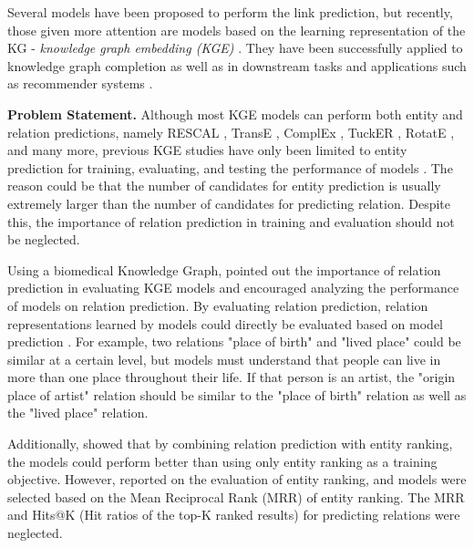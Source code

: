 Several models have been proposed to perform the link prediction, but recently, those given more attention are models based on the learning representation of the KG - \textit{knowledge graph embedding (KGE)} \citep{wang2017knowledge}. They have been successfully applied to knowledge graph completion \citep{2016} as well as in downstream tasks and applications such as recommender systems \citep{wang2017knowledge}.
\newline

\noindent\textbf{Problem Statement.} Although most KGE models can perform both entity and relation predictions, \citep{wang2017knowledge} namely RESCAL \citep{nickel2011three}, TransE \citep{bordes2013translating}, ComplEx \citep{trouillon2016complex}, TuckER \citep{balazevic-etal-2019-tucker}, RotatE \citep{sun2019rotate}, and many more, previous KGE studies have only been limited to entity prediction for training, evaluating, and testing the performance of models \citep{yang2014embedding, wang2014knowledge, trouillon2016complex, shang2018endtoend, sun2019rotate}. 
The reason could be that the number of candidates for entity prediction is usually extremely larger than the number of candidates for predicting relation. Despite this, the importance of relation prediction in training and evaluation should not be neglected.

Using a biomedical Knowledge Graph, \citet{chang2020benchmark} pointed out the importance of relation prediction in evaluating KGE models and encouraged analyzing the performance of models on relation prediction. By evaluating relation prediction, relation representations learned by models could directly be evaluated based on model prediction \citep{chang2020benchmark}. For example, two relations "place of birth" and "lived place" could be similar at a certain level, but models must understand that people can live in more than one place throughout their life. If that person is an artist, the "origin place of artist" relation should be similar to the "place of birth" relation as well as the "lived place" relation.

Additionally, \citet{chen2021relation} showed that by combining relation prediction with entity ranking, the models could perform better than using only entity ranking as a training objective. 
However, \citet{chen2021relation} reported on the evaluation of entity ranking, and models were selected based on the Mean Reciprocal Rank (MRR) of entity ranking. The MRR and Hits@K (Hit ratios of the top-K ranked results) for predicting relations were neglected. 
\newline

